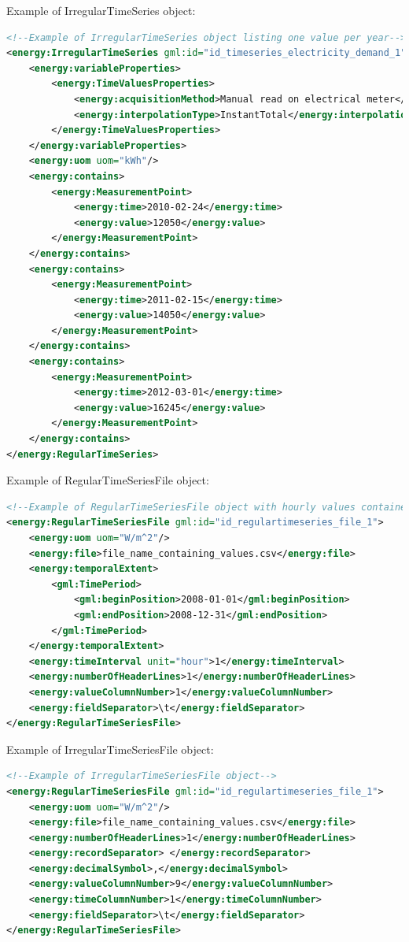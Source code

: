 \documentclass[a4paper,12pt]{article}
\begin{document}
Example of IrregularTimeSeries object:

\begin{lstlisting}[language=XML]
<!--Example of IrregularTimeSeries object listing one value per year-->
<energy:IrregularTimeSeries gml:id="id_timeseries_electricity_demand_1">
    <energy:variableProperties>
        <energy:TimeValuesProperties>
            <energy:acquisitionMethod>Manual read on electrical meter</energy:acquisitionMethod>
            <energy:interpolationType>InstantTotal</energy:interpolationType>
        </energy:TimeValuesProperties>
    </energy:variableProperties>
    <energy:uom uom="kWh"/>
    <energy:contains>
        <energy:MeasurementPoint>
            <energy:time>2010-02-24</energy:time>
            <energy:value>12050</energy:value>
        </energy:MeasurementPoint>
    </energy:contains>
    <energy:contains>
        <energy:MeasurementPoint>
            <energy:time>2011-02-15</energy:time>
            <energy:value>14050</energy:value>
        </energy:MeasurementPoint>
    </energy:contains>
    <energy:contains>
        <energy:MeasurementPoint>
            <energy:time>2012-03-01</energy:time>
            <energy:value>16245</energy:value>
        </energy:MeasurementPoint>
    </energy:contains>
</energy:RegularTimeSeries>
\end{lstlisting}

Example of RegularTimeSeriesFile object:

\begin{lstlisting}[language=XML]
<!--Example of RegularTimeSeriesFile object with hourly values contained in a file-->
<energy:RegularTimeSeriesFile gml:id="id_regulartimeseries_file_1">
    <energy:uom uom="W/m^2"/>
    <energy:file>file_name_containing_values.csv</energy:file>
    <energy:temporalExtent>
        <gml:TimePeriod>
            <gml:beginPosition>2008-01-01</gml:beginPosition>
            <gml:endPosition>2008-12-31</gml:endPosition>
        </gml:TimePeriod>
    </energy:temporalExtent>
    <energy:timeInterval unit="hour">1</energy:timeInterval>
    <energy:numberOfHeaderLines>1</energy:numberOfHeaderLines>
    <energy:valueColumnNumber>1</energy:valueColumnNumber>
    <energy:fieldSeparator>\t</energy:fieldSeparator>
</energy:RegularTimeSeriesFile>
\end{lstlisting}

Example of IrregularTimeSeriesFile object:

\begin{lstlisting}[language=XML]
<!--Example of IrregularTimeSeriesFile object-->
<energy:RegularTimeSeriesFile gml:id="id_regulartimeseries_file_1">
    <energy:uom uom="W/m^2"/>
    <energy:file>file_name_containing_values.csv</energy:file>
    <energy:numberOfHeaderLines>1</energy:numberOfHeaderLines>
    <energy:recordSeparator> </energy:recordSeparator>
    <energy:decimalSymbol>,</energy:decimalSymbol>
    <energy:valueColumnNumber>9</energy:valueColumnNumber>
    <energy:timeColumnNumber>1</energy:timeColumnNumber>
    <energy:fieldSeparator>\t</energy:fieldSeparator>
</energy:RegularTimeSeriesFile>
\end{lstlisting}
\end{document}
